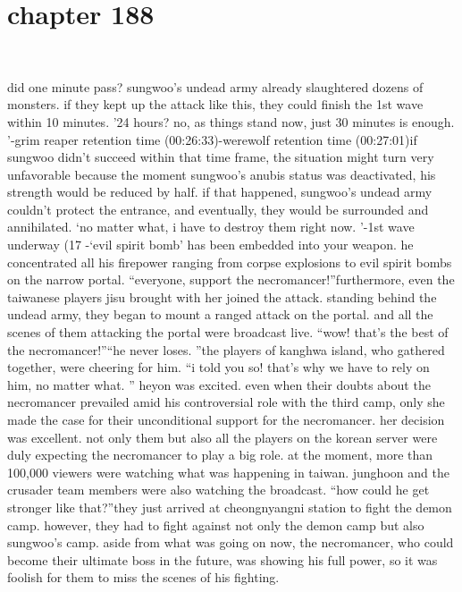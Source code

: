 \section{chapter 188}

                             




did one minute pass? sungwoo’s undead army already slaughtered dozens of monsters.
if they kept up the attack like this, they could finish the 1st wave within 10 minutes.
’24 hours? no, as things stand now, just 30 minutes is enough.
’-grim reaper retention time (00:26:33)-werewolf retention time (00:27:01)if sungwoo didn’t succeed within that time frame, the situation might turn very unfavorable because the moment sungwoo’s anubis status was deactivated, his strength would be reduced by half.
 if that happened, sungwoo’s undead army couldn’t protect the entrance, and eventually, they would be surrounded and annihilated.
‘no matter what, i have to destroy them right now.
’-1st wave underway (17%
-‘evil spirit bomb’ has been embedded into your weapon.
he concentrated all his firepower ranging from corpse explosions to evil spirit bombs on the narrow portal.
“everyone, support the necromancer!”furthermore, even the taiwanese players jisu brought with her joined the attack.
 standing behind the undead army, they began to mount a ranged attack on the portal.
and all the scenes of them attacking the portal were broadcast live.
“wow! that’s the best of the necromancer!”“he never loses.
”the players of kanghwa island, who gathered together, were cheering for him.
“i told you so! that’s why we have to rely on him, no matter what.
”
heyon was excited.
 even when their doubts about the necromancer prevailed amid his controversial role with the third camp, only she made the case for their unconditional support for the necromancer.
 her decision was excellent.
not only them but also all the players on the korean server were duly expecting the necromancer to play a big role.
 at the moment, more than 100,000 viewers were watching what was happening in taiwan.
junghoon and the crusader team members were also watching the broadcast.
“how could he get stronger like that?”they just arrived at cheongnyangni station to fight the demon camp.
however, they had to fight against not only the demon camp but also sungwoo’s camp.
 aside from what was going on now, the necromancer, who could become their ultimate boss in the future, was showing his full power, so it was foolish for them to miss the scenes of his fighting.
